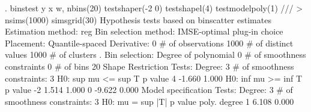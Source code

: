 . binstest y x w, nbins(20) testshaper(-2 0) testshapel(4) testmodelpoly(1) ///
>                    nsims(1000) simsgrid(30)
{\smallskip}
Hypothesis tests based on binscatter estimates
Estimation method: reg
Bin selection method: IMSE-optimal plug-in choice
Placement: Quantile-spaced
Derivative: 0
{\smallskip}
\# of observations             {\VBAR}    1000
\# of distinct values          {\VBAR}    1000
\# of clusters                 {\VBAR}       .
Bin selection:                {\VBAR} 
         Degree of polynomial {\VBAR}       0
  \# of smoothness constraints {\VBAR}       0
                    \# of bins {\VBAR}      20
{\smallskip}
Shape Restriction Tests:
Degree: 3     \# of smoothness constraints: 3
{\smallskip}
H0: sup mu <=      {\VBAR} sup T             p value
         4         {\VBAR}  -1.660             1.000
{\smallskip}
H0: inf mu >=      {\VBAR} inf T             p value
         -2        {\VBAR}   1.514             1.000
         0         {\VBAR}  -9.622             0.000
{\smallskip}
Model specification Tests:
Degree: 3     \# of smoothness constraints: 3
{\smallskip}
H0: mu =           {\VBAR} sup |T|           p value
poly. degree  1    {\VBAR}   6.108             0.000
